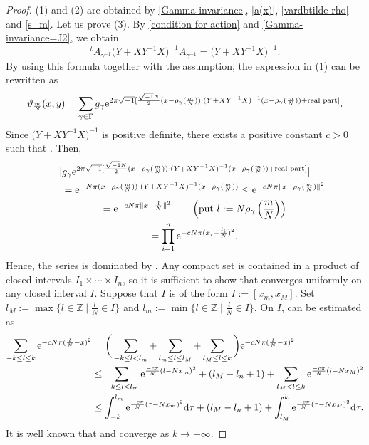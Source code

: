 \documentclass[pdftex]{sigma}
\numberwithin{equation}{section}
\newcommand{\Z}{\mathbb{Z}}
\newcommand{\norm}[1]{\lVert#1\rVert}
\begin{document}
\begin{proof}
(1) and (2) are obtained by \eqref{Gamma-invariance}, \eqref{a(x)}, \eqref{vardbtilde rho} and \eqref{s_m}.
Let us prove (3). By \eqref{condition for action} and \eqref{Gamma-invariance=J2}, we obtain
\[
{}^tA_{\gamma^{-1}}\bigl(Y+XY^{-1}X\bigr)^{-1}A_{\gamma^{-1}}=\bigl(Y+XY^{-1}X\bigr)^{-1}.
\]
By using this formula together with the assumption, the expression in (1) can be rewritten as
\begin{equation*}
\vartheta_{\frac{m}{N}}(x,y)=\sum_{\gamma \in \Gamma}g_\gamma {\rm e}^{2\pi\sqrt{-1} [\frac{\sqrt{-1}N}{2} (x-\rho_{\gamma} ( \frac{m}{N} ) )\cdot (Y+XY^{-1}X)^{-1} (x-\rho_{\gamma}(\frac{m}{N}) ) +\text{real part} ]}.
\end{equation*}
Since $\bigl(Y+XY^{-1}X\bigr)^{-1}$ is positive definite, there exists a positive constant $c>0$ such that . Then,
\begin{gather*}
 | g_\gamma {\rm e}^{2\pi\sqrt{-1} [\frac{\sqrt{-1}N}{2} (x-\rho_{\gamma} ( \frac{m}{N} ) )\cdot (Y+XY^{-1}X)^{-1} (x-\rho_{\gamma}(\frac{m}{N}) ) +\text{real part} ]} | \\
\qquad={\rm e}^{-N\pi (x-\rho_{\gamma} ( \frac{m}{N} ) )\cdot (Y+XY^{-1}X)^{-1} (x-\rho_{\gamma}(\frac{m}{N}) )}
\le {\rm e}^{-cN\pi \norm{ x-\rho_{\gamma} ( \frac{m}{N} )}^2}\\
\qquad= {\rm e}^{-cN\pi \norm{ x-\frac{l}{N}}^2}
\qquad \left(\text{put } l:=N\rho_{\gamma} \left( \frac{m}{N} \right) \right)\\
\qquad= \prod_{i=1}^n {\rm e}^{-cN\pi (x_i-\frac{l_i}{N} )^2}.
\end{gather*}
Hence, the series is dominated by \smash{$\prod_{i=1}^n\sum_{l_i\in \Z}{\rm e}^{-cN\pi (\frac{l_i}{N}-x_i)^2}$}. Any compact set is contained in a product of closed intervals $I_1\times \cdots \times I_n$, so it is sufficient to show that \smash{$\sum_{l\in \Z}{\rm e}^{-cN\pi (\frac{l}{N}-x)^2}$} converges uniformly on any closed interval $I$.
Suppose that $I$ is of the form $I:=[x_m, x_M]$. Set~${l_M:=\max \big\{ l\in \Z \mid \frac{l}{N}\in I\big\}}$ and $l_m:=\min \big\{ l\in \Z \mid \frac{l}{N}\in I\big\}$. On $I$,  can be estimated as
\begin{align*}
\sum_{-k\le l\le k}{\rm e}^{-cN\pi (\frac{l}{N}-x)^2}&=\bigg(\sum_{-k\le l<l_m}+\sum_{l_m\le l\le l_M}+\sum_{l_M\le l\le k}\bigg){\rm e}^{-cN\pi (\frac{l}{N}-x)^2}\\
&\le \sum_{-k\le l<l_m}{\rm e}^{\frac{-c\pi}{N} (l-Nx_m)^2}+(l_M-l_n+1)+\sum_{l_M< l\le k}{\rm e}^{\frac{-c\pi}{N} (l-Nx_M)^2}\\
&\le \int_{-k}^{l_m}{\rm e}^{\frac{-c\pi}{N}(\tau -Nx_m)^2}{\rm d}\tau +(l_M-l_n+1)+\int_{l_M}^k {\rm e}^{\frac{-c\pi}{N}(\tau -Nx_M)^2}{\rm d}\tau.
\end{align*}
It is well known that  and  converge as ${k\to +\infty}$.
\end{proof}
\end{document}
